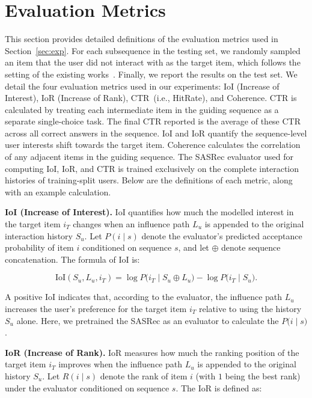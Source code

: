\documentclass{llmxive}
\begin{document}
\section{Evaluation Metrics}
\label{app:evaluation}

This section provides detailed definitions of the evaluation metrics used in Section~\ref{sec:exp}. For each subsequence in the testing set, we randomly sampled an item that the user did not interact with as the target item, which follows the setting of the existing works~\cite{bi2024proactive,wang2025leveraging,wang2025tunable}. Finally, we report the results on the test set. We detail the four evaluation metrics used in our experiments: IoI (Increase of Interest), IoR (Increase of Rank), CTR~(i.e., HitRate), and Coherence. CTR is calculated by treating each intermediate item in the guiding sequence as a separate single-choice task. The final CTR reported is the average of these CTR across all correct answers in the sequence. IoI and IoR quantify the sequence-level user interests shift towards the target item. Coherence calculates the correlation of any adjacent items in the guiding sequence. The SASRec evaluator used for computing IoI, IoR, and CTR is trained exclusively on the complete interaction histories of training-split users. Below are the definitions of each metric, along with an example calculation.

\textbf{IoI (Increase of Interest).} IoI quantifies how much the modelled interest in the target item $i_T$ changes when an influence path $L_u$ is appended to the original interaction history $S_u$. Let $P(i \mid s)$ denote the evaluator's predicted acceptance probability of item $i$ conditioned on sequence $s$, and let $\oplus$ denote sequence concatenation. The formula of IoI is:

\begin{equation}
\mathrm{IoI}(S_u, L_u, i_T)
=
\log P\bigl(i_T \mid S_u \oplus L_u\bigr)
-
\log P\bigl(i_T \mid S_u\bigr).
\end{equation}

A positive IoI indicates that, according to the evaluator, the influence path $L_u$ increases the user's preference for the target item $i_T$ relative to using the history $S_u$ alone. Here, we pretrained the SASRec as an evaluator to calculate the $P\bigl(i \mid s\bigr)$.

\textbf{IoR (Increase of Rank).} IoR measures how much the ranking position of the target item $i_T$ improves when the influence path $L_u$ is appended to the original history $S_u$. Let $R(i \mid s)$ denote the rank of item $i$ (with $1$ being the best rank) under the evaluator conditioned on sequence $s$. The IoR is defined as: 
\end{document}
